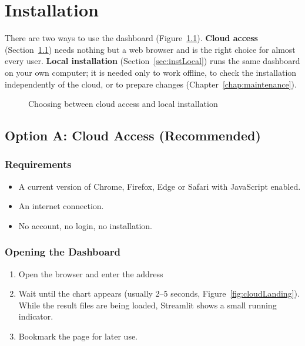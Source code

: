 %
%
%


\chapter{Installation}
\label{chap:install}

There are two ways to use the dashboard (Figure~\ref{fig:installPaths}). \textbf{Cloud access} (Section~\ref{sec:instCloud}) needs nothing but a web browser and is the right choice for almost every user. \textbf{Local installation} (Section~\ref{sec:instLocal}) runs the same dashboard on your own computer; it is needed only to work offline, to check the installation independently of the cloud, or to prepare changes (Chapter~\ref{chap:maintenance}).

\begin{figure}[H]
  \centering
  \resizebox{0.95\linewidth}{!}{}
  \caption{Choosing between cloud access and local installation}
  \label{fig:installPaths}
\end{figure}

\section{Option A: Cloud Access (Recommended)}
\label{sec:instCloud}

\subsection{Requirements}

\begin{itemize}
  \item A current version of Chrome, Firefox, Edge or Safari with JavaScript enabled.
  \item An internet connection.
  \item No account, no login, no installation.
\end{itemize}

\subsection{Opening the Dashboard}

\begin{enumerate}
  \item Open the browser and enter the address\\[2pt]
        \AppLink
  \item Wait until the chart appears (usually 2--5 seconds, Figure~\ref{fig:cloudLanding}). While the result files are being loaded, Streamlit shows a small running indicator.
  \item Bookmark the page for later use.
\end{enumerate}

